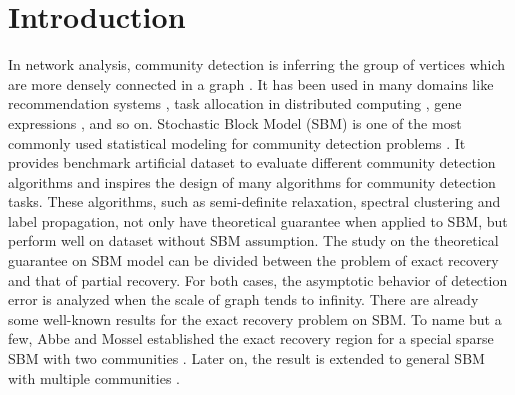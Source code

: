 \documentclass[entropy,article,submit,moreauthors,pdftex]{Definitions/mdpi}
\newcommand{\1}{\mathbbm{1}}
\begin{document}


\section{Introduction}
In network analysis, community detection is inferring the group of vertices which
are more densely connected in a graph \cite{fortunato2010community}. It has been used in many domains like recommendation systems \cite{feng2015personalized},
task allocation in distributed computing \cite{hendrickson2000graph}, gene expressions \cite{cline2007integration}, and so on.
Stochastic Block Model (SBM) is one of the most commonly used statistical modeling for community detection problems  \cite{holland1983stochastic, abbe2017community}.
It provides benchmark artificial dataset to evaluate different community detection algorithms
and inspires the design of many algorithms for community detection tasks. These algorithms, such as
semi-definite relaxation, spectral clustering and label propagation, not only have theoretical guarantee when applied to SBM,
but perform well on dataset without SBM assumption. The study on the theoretical guarantee on SBM model can be divided between
the problem of exact recovery and that of partial recovery. For both cases, the asymptotic behavior of detection error
is analyzed when the scale of graph tends to infinity. There are already some well-known results for the exact recovery problem
on SBM.	To name but a few, Abbe and Mossel established the exact recovery region for a special sparse SBM with two communities  \cite{abbe2015exact, mossel2016}.
Later on, the result is extended to general SBM with multiple communities \cite{abbe2015community}.
\end{document}
